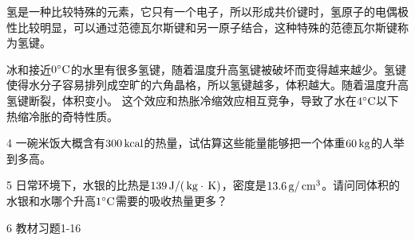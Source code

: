 \documentclass[CJK]{beamer}
\begin{document}
\begin{frame}
\bch
氢是一种比较特殊的元素，它只有一个电子，所以形成共价键时，氢原子的电偶极性比较明显，可以通过范德瓦尔斯键和另一原子结合，这种特殊的范德瓦尔斯键称为氢键。

\skipline


冰和接近$0^\circ \mathrm{C}$的水里有很多氢键，随着温度升高氢键被破坏而变得越来越少。氢键使得水分子容易排列成空旷的六角晶格，所以氢键越多，体积越大。随着温度升高氢键断裂，体积变小。
这个效应和热胀冷缩效应相互竞争，导致了水在$4^\circ \mathrm{C}$以下热缩冷胀的奇特性质。


\ech
\end{frame}


\begin{frame}
\bch
\bitem
\item[4]{一碗米饭大概含有$300\,\mathrm{kcal}$的热量，试估算这些能量能够把一个体重$60\,\mathrm{kg}$的人举到多高。}
\item[5]{日常环境下，水银的比热是$139 \,\mathrm{J}/(\,\mathrm{kg}\cdot\,\mathrm{K})$，密度是$13.6\,\mathrm{g}/\,\mathrm{cm}^3$。请问同体积的水银和水哪个升高$1^\circ \mathrm{C}$需要的吸收热量更多？}
\item[6]{教材习题1-16}
\eitem
\ech
\end{frame}
\end{document}
